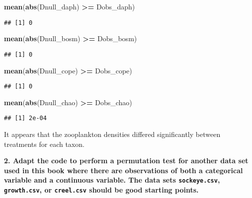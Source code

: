 \documentclass[]{book}
\newenvironment{Shaded}{\begin{snugshade}}{\end{snugshade}}
\newcommand{\KeywordTok}[1]{\textcolor[rgb]{0.13,0.29,0.53}{\textbf{#1}}}
\newcommand{\StringTok}[1]{\textcolor[rgb]{0.31,0.60,0.02}{#1}}
\newcommand{\OperatorTok}[1]{\textcolor[rgb]{0.81,0.36,0.00}{\textbf{#1}}}
\newcommand{\NormalTok}[1]{#1}
\theoremstyle{definition}
\theoremstyle{definition}
\theoremstyle{definition}
\theoremstyle{remark}
\begin{document}
\begin{Shaded}
\begin{Highlighting}[]
\KeywordTok{mean}\NormalTok{(}\KeywordTok{abs}\NormalTok{(Dnull_daph) }\OperatorTok{>=}\StringTok{ }\NormalTok{Dobs_daph)}
\end{Highlighting}
\end{Shaded}

\begin{verbatim}
## [1] 0
\end{verbatim}

\begin{Shaded}
\begin{Highlighting}[]
\KeywordTok{mean}\NormalTok{(}\KeywordTok{abs}\NormalTok{(Dnull_bosm) }\OperatorTok{>=}\StringTok{ }\NormalTok{Dobs_bosm)}
\end{Highlighting}
\end{Shaded}

\begin{verbatim}
## [1] 0
\end{verbatim}

\begin{Shaded}
\begin{Highlighting}[]
\KeywordTok{mean}\NormalTok{(}\KeywordTok{abs}\NormalTok{(Dnull_cope) }\OperatorTok{>=}\StringTok{ }\NormalTok{Dobs_cope)}
\end{Highlighting}
\end{Shaded}

\begin{verbatim}
## [1] 0
\end{verbatim}

\begin{Shaded}
\begin{Highlighting}[]
\KeywordTok{mean}\NormalTok{(}\KeywordTok{abs}\NormalTok{(Dnull_chao) }\OperatorTok{>=}\StringTok{ }\NormalTok{Dobs_chao)}
\end{Highlighting}
\end{Shaded}

\begin{verbatim}
## [1] 2e-04
\end{verbatim}

It appears that the zooplankton densities differed significantly between
treatments for each taxon.

\textbf{2. Adapt the code to perform a permutation test for another data
set used in this book where there are observations of both a categorical
variable and a continuous variable. The data sets \texttt{sockeye.csv},
\texttt{growth.csv}, or \texttt{creel.csv} should be good starting
points.}
\end{document}
